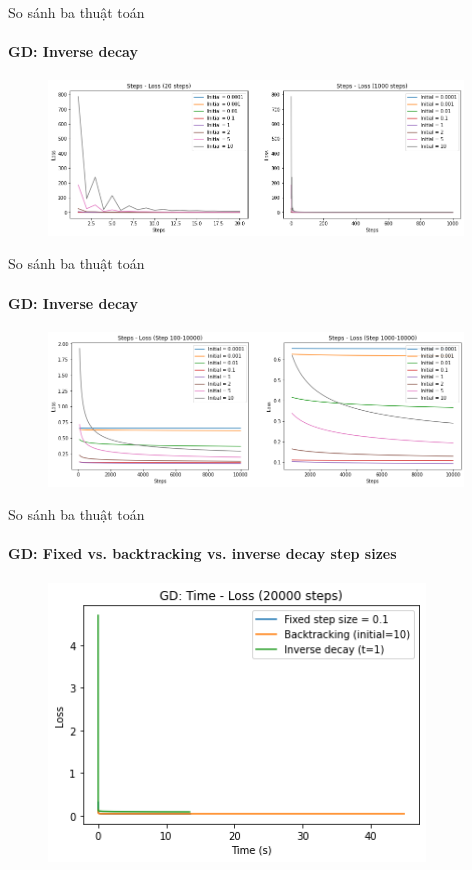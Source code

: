 \documentclass[10pt]{beamer}
\theoremstyle{remark}
\theoremstyle{definition}
\begin{document}
\begin{frame}{So sánh ba thuật toán}
	\framesubtitle{GD: Inverse decay}
	\begin{figure}[h!]
		\centering
		\includegraphics[width=11cm]{Thinh/7.png}
	\end{figure}
\end{frame}

\begin{frame}{So sánh ba thuật toán}
	\framesubtitle{GD: Inverse decay}

	\begin{figure}[h!]
		\centering
		\includegraphics[width=11cm]{Thinh/8.png}
	\end{figure}
\end{frame}

\begin{frame}{So sánh ba thuật toán}
	\framesubtitle{GD: Fixed vs. backtracking vs. inverse decay step sizes}
	\begin{figure}[h!]
		\centering
		\includegraphics[width=10cm]{Thinh/9.png}
	\end{figure}

\end{frame}
\end{document}
